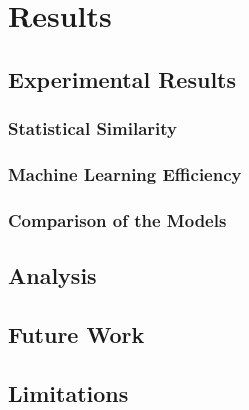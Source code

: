 \chapter{Results}
\label{ch:results}
\section{Experimental Results}
\label{ch:results-experimentalResults}

\subsection{Statistical Similarity}
\label{ch:results-experimentalResults-statisticalSimilarity}

\subsection{Machine Learning Efficiency}
\label{ch:results-experimentalResults-machineLearningEfficiency}

\subsection{Comparison of the Models}
\label{ch:results-experimentalResults-comparisonOfTheModels}
\section{Analysis}
\label{ch:results-analysis}
\section{Future Work}
\label{ch:results-futureWork}



\section{Limitations}
\label{ch:results-limitations}

